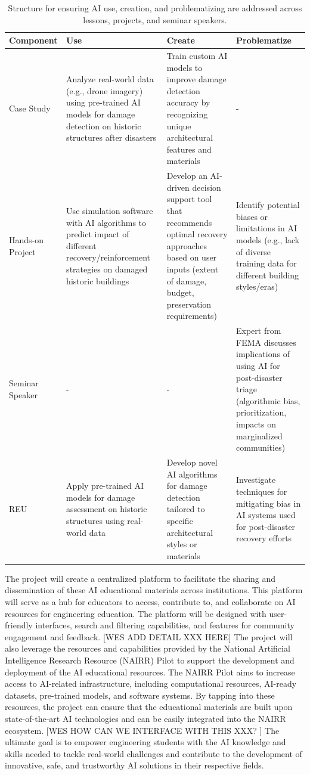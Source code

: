 \documentclass[11pt]{article}
\begin{document}
\begin{table}
\centering
\caption{Structure for ensuring AI use, creation, and problematizing are addressed across lessons, projects, and seminar speakers.}
\begin{tabular}{|p{2cm}|p{4cm}|p{4cm}|p{4cm}|}
\hline
\small
\textbf{Component} & \textbf{Use} & \textbf{Create} & \textbf{Problematize} \\
\hline
Case Study & Analyze real-world data (e.g., drone imagery) using pre-trained AI models for damage detection on historic structures after disasters & Train custom AI models to improve damage detection accuracy by recognizing unique architectural features and materials & - \\
\hline
Hands-on Project & Use simulation software with AI algorithms to predict impact of different recovery/reinforcement strategies on damaged historic buildings & Develop an AI-driven decision support tool that recommends optimal recovery approaches based on user inputs (extent of damage, budget, preservation requirements) & Identify potential biases or limitations in AI models (e.g., lack of diverse training data for different building styles/eras)  \\
\hline
Seminar Speaker & - & - & Expert from FEMA discusses implications of using AI for post-disaster triage (algorithmic bias, prioritization, impacts on marginalized communities) \\
\hline
REU & Apply pre-trained AI models for damage assessment on historic structures using real-world data & Develop novel AI algorithms for damage detection tailored to specific architectural styles or materials & Investigate techniques for mitigating bias in AI systems used for post-disaster recovery efforts \\
\hline
\end{tabular}
\label{tab:edu}
\end{table}
\normalsize

The project will create a centralized platform to facilitate the sharing and dissemination of these AI educational materials across institutions. This platform will serve as a hub for educators to access, contribute to, and collaborate on AI resources for engineering education. The platform will be designed with user-friendly interfaces, search and filtering capabilities, and features for community engagement and feedback.
[WES ADD DETAIL XXX HERE]
The project will also leverage the resources and capabilities provided by the National Artificial Intelligence Research Resource (NAIRR) Pilot to support the development and deployment of the AI educational resources. The NAIRR Pilot aims to increase access to AI-related infrastructure, including computational resources, AI-ready datasets, pre-trained models, and software systems. By tapping into these resources, the project can ensure that the educational materials are built upon state-of-the-art AI technologies and can be easily integrated into the NAIRR ecosystem.
[WES HOW CAN WE INTERFACE WITH THIS XXX? ]
The ultimate goal is to empower engineering students with the AI knowledge and skills needed to tackle real-world challenges and contribute to the development of innovative, safe, and trustworthy AI solutions in their respective fields.
\end{document}
